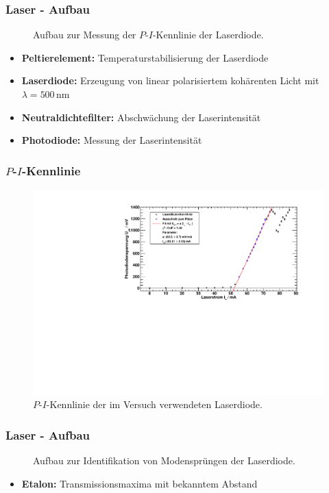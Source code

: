 \begin{frame}
\frametitle{Laser - Aufbau}
\begin{figure}
    \centering
    \def\svgwidth{\textwidth}
    
    \caption{Aufbau zur Messung der $P$-$I$-Kennlinie der Laserdiode.}
\end{figure}
\begin{itemize}
  \item \textbf{Peltierelement:} Temperaturstabilisierung der Laserdiode
  \item \textbf{Laserdiode:} Erzeugung von linear polarisiertem kohärenten Licht mit $\lambda=500$\,nm
  \item \textbf{Neutraldichtefilter:} Abschwächung der Laserintensität
  \item \textbf{Photodiode:} Messung der Laserintensität
\end{itemize}
\end{frame}

\begin{frame}
\frametitle{$P$-$I$-Kennlinie}

\begin{figure}[H]
    \begin{center}
        \includegraphics[width=\textwidth]{../img/diodenkennlinie.pdf}
        \caption{$P$-$I$-Kennlinie der im Versuch verwendeten Laserdiode.}
    \end{center}
\end{figure}
\end{frame}


\begin{frame}
\frametitle{Laser - Aufbau}
\begin{figure}
    \centering
    \def\svgwidth{\textwidth}
    
    \caption{Aufbau zur Identifikation von Modensprüngen der Laserdiode.}
\end{figure}
\begin{itemize}
  \item \textbf{Etalon:} Transmissionsmaxima mit bekanntem Abstand
\end{itemize}
\end{frame}


